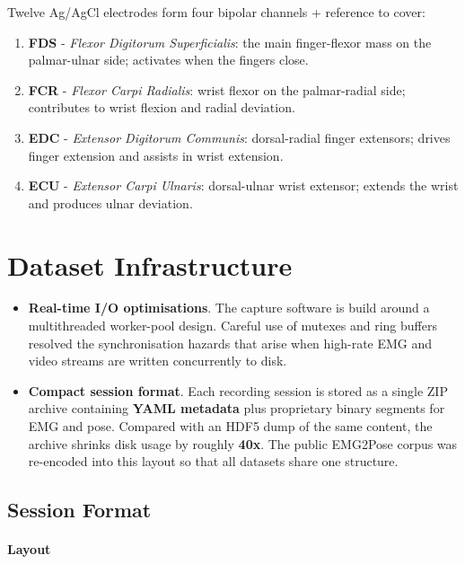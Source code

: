 Twelve Ag/AgCl electrodes form four bipolar channels + reference to cover:

\begin{enumerate}[label=\alph*]
  \item \textbf{FDS} - \emph{Flexor Digitorum Superficialis}: the main finger-flexor mass on the palmar-ulnar side; activates when the fingers close.
  \item \textbf{FCR} - \emph{Flexor Carpi Radialis}: wrist flexor on the palmar-radial side; contributes to wrist flexion and radial deviation.
  \item \textbf{EDC} - \emph{Extensor Digitorum Communis}: dorsal-radial finger extensors; drives finger extension and assists in wrist extension.
  \item \textbf{ECU} - \emph{Extensor Carpi Ulnaris}: dorsal-ulnar wrist extensor; extends the wrist and produces ulnar deviation.
\end{enumerate}

\section{Dataset Infrastructure}
\begin{itemize}
    \item \textbf{Real-time I/O optimisations}.
          The capture software is build around a multithreaded
          worker-pool design. Careful use of mutexes and ring buffers resolved
          the synchronisation hazards that arise when high-rate EMG and video
          streams are written concurrently to disk.
    \item \textbf{Compact session format}.
          Each recording session is stored as a single ZIP archive containing
          \textbf{YAML metadata} plus proprietary binary segments for EMG and
          pose. Compared with an HDF5 dump of the same content, the archive
          shrinks disk usage by roughly \textbf{40x}. The public EMG2Pose
          corpus was re-encoded into this layout so that all datasets share one
          structure.
\end{itemize}

\subsection{Session Format}

\paragraph{Layout}

